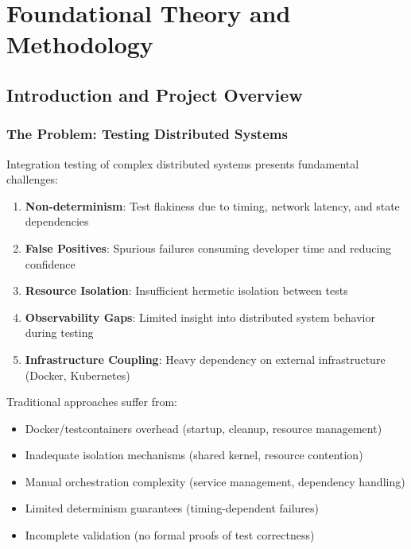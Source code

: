 \documentclass[12pt,twoside,openright]{book}
\theoremstyle{plain}
\theoremstyle{definition}
\theoremstyle{remark}
\begin{document}
\clearpage

\tableofcontents
\clearpage

\listoffigures
\clearpage

\listoftables
\clearpage


\mainmatter


\part{Foundational Theory and Methodology}

\chapter{Introduction and Project Overview}

\section{The Problem: Testing Distributed Systems}

Integration testing of complex distributed systems presents fundamental challenges:

\begin{enumerate}
  \item \textbf{Non-determinism}: Test flakiness due to timing, network latency, and state dependencies
  \item \textbf{False Positives}: Spurious failures consuming developer time and reducing confidence
  \item \textbf{Resource Isolation}: Insufficient hermetic isolation between tests
  \item \textbf{Observability Gaps}: Limited insight into distributed system behavior during testing
  \item \textbf{Infrastructure Coupling}: Heavy dependency on external infrastructure (Docker, Kubernetes)
\end{enumerate}

Traditional approaches suffer from:
\begin{itemize}
  \item Docker/testcontainers overhead (startup, cleanup, resource management)
  \item Inadequate isolation mechanisms (shared kernel, resource contention)
  \item Manual orchestration complexity (service management, dependency handling)
  \item Limited determinism guarantees (timing-dependent failures)
  \item Incomplete validation (no formal proofs of test correctness)
\end{itemize}
\end{document}
